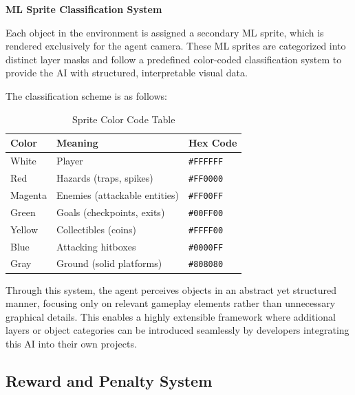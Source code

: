 \documentclass[12pt,oneside,openright,a4paper]{cpe-english-project}
\begin{document}
\textbf{ML Sprite Classification System}\par
Each object in the environment is assigned a secondary ML sprite, which is rendered exclusively for the agent camera. These ML sprites are categorized into distinct layer masks and follow a predefined color-coded classification system to provide the AI with structured, interpretable visual data.\par
The classification scheme is as follows:\par
\begin{table}[!h]
\caption{Sprite Color Code Table}\label{tbl:Sprite Color Code Table}
\begin{tabular}{|l|l|l|} \hline
\textbf{Color} & \textbf{Meaning} & \textbf{Hex Code} \\ \hline
White & Player & \texttt{\#FFFFFF} \\ 
Red & Hazards (traps, spikes) & \texttt{\#FF0000} \\ 
Magenta & 	Enemies (attackable entities) & \texttt{\#FF00FF}  \\ 
Green & Goals (checkpoints, exits) & \texttt{\#00FF00} \\ 
Yellow & Collectibles (coins) & \texttt{\#FFFF00} \\ 
Blue & Attacking hitboxes & \texttt{\#0000FF} \\ 
Gray & Ground (solid platforms) & \texttt{\#808080} \\ \hline
\end{tabular}
\end{table}
Through this system, the agent perceives objects in an abstract yet structured manner, focusing only on relevant gameplay elements rather than unnecessary graphical details. This enables a highly extensible framework where additional layers or object categories can be introduced seamlessly by developers integrating this AI into their own projects.

\subsection{Reward and Penalty System}
\end{document}
